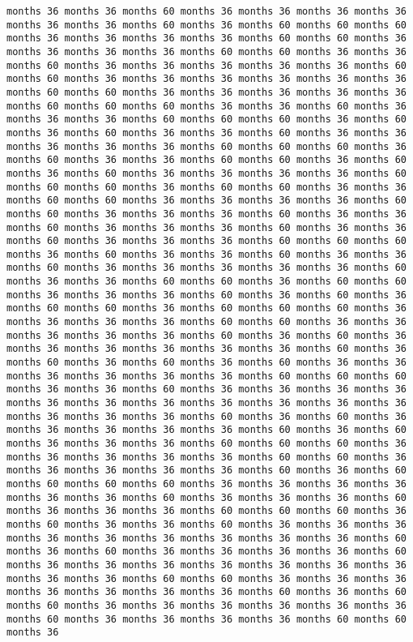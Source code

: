 \documentclass[11pt]{article}
\begin{document}
\begin{Verbatim}[commandchars=\\\{\}, frame=single, framerule=2mm, rulecolor=\color{outerrorbackground}]
months 36 months 36 months 60 months 36 months 36 months 36 months 36 months 36 months 36 months 60 months 36 months 60 months 60 months 60 months 36 months 36 months 36 months 36 months 60 months 60 months 36 months 36 months 36 months 36 months 60 months 60 months 36 months 36 months 60 months 36 months 36 months 36 months 36 months 36 months 60 months 60 months 36 months 36 months 36 months 36 months 36 months 36 months 60 months 60 months 36 months 36 months 36 months 36 months 36 months 60 months 60 months 60 months 36 months 36 months 60 months 36 months 36 months 36 months 60 months 60 months 60 months 36 months 60 months 36 months 60 months 36 months 36 months 60 months 36 months 36 months 36 months 36 months 36 months 60 months 60 months 60 months 36 months 60 months 36 months 36 months 60 months 60 months 36 months 60 months 36 months 60 months 36 months 36 months 36 months 36 months 60 months 60 months 60 months 36 months 60 months 60 months 36 months 36 months 60 months 60 months 36 months 36 months 36 months 36 months 60 months 60 months 36 months 36 months 36 months 60 months 36 months 36 months 60 months 36 months 36 months 36 months 60 months 36 months 36 months 60 months 36 months 36 months 36 months 60 months 60 months 60 months 36 months 60 months 36 months 36 months 60 months 36 months 36 months 60 months 36 months 36 months 36 months 36 months 36 months 60 months 36 months 36 months 60 months 60 months 36 months 60 months 60 months 36 months 36 months 36 months 60 months 36 months 60 months 36 months 60 months 60 months 36 months 60 months 60 months 60 months 36 months 36 months 36 months 36 months 60 months 60 months 36 months 36 months 36 months 36 months 36 months 60 months 36 months 60 months 36 months 36 months 36 months 36 months 36 months 36 months 60 months 36 months 60 months 36 months 60 months 36 months 60 months 36 months 36 months 36 months 36 months 36 months 36 months 60 months 60 months 60 months 36 months 36 months 60 months 36 months 36 months 36 months 36 months 36 months 36 months 36 months 36 months 36 months 36 months 36 months 36 months 36 months 36 months 60 months 36 months 60 months 36 months 36 months 36 months 36 months 36 months 60 months 36 months 60 months 36 months 36 months 36 months 60 months 60 months 60 months 36 months 36 months 36 months 36 months 36 months 60 months 60 months 36 months 36 months 36 months 36 months 36 months 60 months 36 months 60 months 60 months 60 months 60 months 36 months 36 months 36 months 36 months 36 months 36 months 60 months 36 months 36 months 36 months 60 months 36 months 36 months 36 months 60 months 60 months 60 months 36 months 60 months 36 months 36 months 60 months 36 months 36 months 36 months 36 months 36 months 36 months 36 months 36 months 36 months 60 months 36 months 60 months 36 months 36 months 36 months 36 months 60 months 36 months 36 months 36 months 36 months 36 months 36 months 36 months 36 months 36 months 60 months 60 months 36 months 36 months 36 months 36 months 36 months 36 months 36 months 60 months 36 months 60 months 60 months 36 months 36 months 36 months 36 months 36 months 36 months 60 months 36 months 36 months 36 months 36 months 60 months 60 months 36 
\end{Verbatim}
\end{document}
